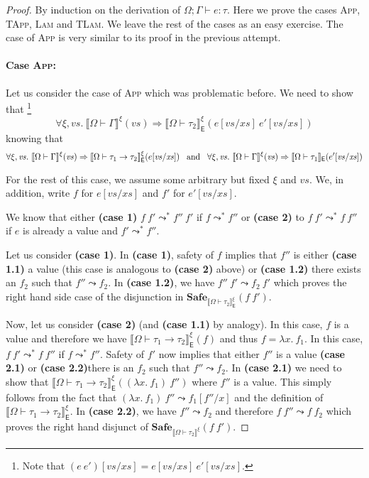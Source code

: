 \documentclass{article}
\newcommand{\EXP}{\mathsf{E}}
\newcommand{\semtyp}[2]{\llbracket #2 \rrbracket_{#1}}
\begin{document}
\begin{proof}
By induction on the derivation of $\Omega ; \Gamma \vdash e : \tau$.
Here we prove the cases \textsc{App}, \textsc{TApp},
\textsc{Lam} and \textsc{TLam}.
We leave the rest of the cases as an easy exercise.
The case of \textsc{App} is very similar to its proof in the previous attempt.

\paragraph{Case \textsc{App}:}
Let us consider the case of \textsc{App} which was problematic before.
We need to show that
\footnote{Note that
$(e~e')[\mathit{vs}/\mathit{xs}] = e[\mathit{vs}/\mathit{xs}]~e'[\mathit{vs}/\mathit{xs}]$.}
\[
\forall \xi, \mathit{vs}.~\semtyp{}{\Omega \vdash \Gamma}^{\xi}(\mathit{vs}) \Rightarrow
\semtyp{\EXP}{\Omega \vdash \tau_2}^{\xi}(e[\mathit{vs}/\mathit{xs}]~e'[\mathit{vs}/\mathit{xs}])
\]
knowing that
\[
\forall \xi, \mathit{vs}.~\semtyp{}{\Omega \vdash \Gamma}^{\xi}(\mathit{vs}) \Rightarrow
\semtyp{\EXP}{\Omega \vdash \tau_1 \to \tau_2}^{\xi}(e[\mathit{vs}/\mathit{xs}])
\hspace{0.5em}\text{ and }\hspace{0.5em}
\forall \xi, \mathit{vs}.~\semtyp{}{\Omega \vdash \Gamma}^{\xi}(\mathit{vs}) \Rightarrow
\semtyp{\EXP}{\Omega \vdash \tau_1
}(e'[\mathit{vs}/\mathit{xs}])
\]

For the rest of this case, we assume some arbitrary but fixed $\xi$ and $\mathit{vs}$.
We, in addition, write $f$ for $e[\mathit{vs}/\mathit{xs}]$
and $f'$ for $e'[\mathit{vs}/\mathit{xs}]$.

We know that either \textbf{(case 1)} $f~f' \leadsto^* f''~f'$ if $f \leadsto^* f''$
or \textbf{(case 2)} to $f~f' \leadsto^* f~f''$ if $e$ is already a value and $f' \leadsto^* f''$.

Let us consider \textbf{(case 1)}.
In \textbf{(case 1)}, safety of $f$ implies that $f''$ is either \textbf{(case 1.1)} a value (this case is analogous to \textbf{(case 2)} above) or \textbf{(case 1.2)} there exists an $f_2$ such that $f'' \leadsto f_2$. In \textbf{(case 1.2)}, we have $f''~f' \leadsto f_2~f'$ which proves
the right hand side case of the disjunction in $\mathbf{Safe}_{\semtyp{\EXP}{\Omega \vdash \tau_2}^{\xi}}(f~f')$.

Now, let us consider \textbf{(case 2)} (and \textbf{(case 1.1)} by analogy). In this case, $f$ is
a value and therefore we have $\semtyp{\EXP}{\Omega \vdash \tau_1 \to \tau_2}^{\xi}(f)$ and thus $f = \lambda x.~f_1$.
In this case, $f~f' \leadsto^* f~f''$ if $f \leadsto^* f''$. Safety of $f'$ now implies that
either $f''$ is a value \textbf{(case 2.1)} or \textbf{(case 2.2)}there is an $f_2$ such that
$f'' \leadsto f_2$.
In \textbf{(case 2.1)} we need to show that $\semtyp{\EXP}{\Omega \vdash \tau_1 \to \tau_2}^{\xi}((\lambda x.~f_1)~f'')$ where $f''$ is a value. This simply follows from the fact that $(\lambda x.~f_1)~f'' \leadsto f_1[f''/x]$ and the definition of $\semtyp{\EXP}{\Omega \vdash \tau_1 \to \tau_2}^{\xi}$.
In \textbf{(case 2.2)}, we have $f'' \leadsto f_2$ and therefore $f~f'' \leadsto f~f_2$ which
proves the right hand disjunct of $\mathbf{Safe}_{\semtyp{}{\Omega \vdash \tau_2}^{\xi}}(f~f')$.


\end{proof}
\end{document}
